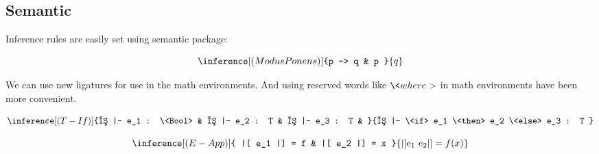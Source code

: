 \subsection{Semantic}

Inference rules are easily set using semantic package:

\[
  \inference[(Modus Ponens)]{%
    p -> q & p
  }{%
    q
  }
\]

We can use new ligatures for use in the math environments.
And using reserved words like $\<where>$ in math environments have been more convenient.

\[
  \inference[(T-If)]{%
    Γ |- e_1 : \<Bool> &
    Γ |- e_2 : T &
    Γ |- e_3 : T &
  }{%
    Γ |- \<if> e_1 \<then> e_2 \<else> e_3 : T
  }
\]

\[
  \inference[(E-App)]
  { |[ e_1 |] = f & |[ e_2 |] = x }
  { |[ e_1~e_2 |] = f(x) }
\]

